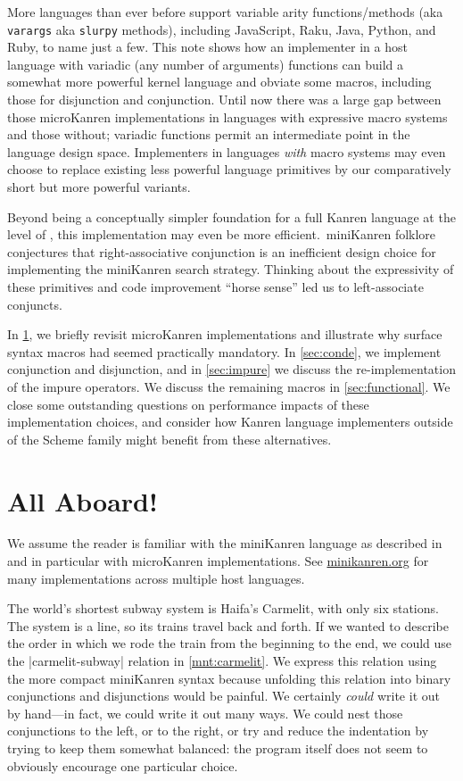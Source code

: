 \documentclass[sigplan,draft,natbib=false]{acmart}
\begin{document}
More languages than ever before support variable arity
functions/methods (aka \verb|varargs| aka \verb|slurpy| methods),
including JavaScript, Raku, Java, Python, and Ruby, to name just a
few. This note shows how an implementer in a host language with
variadic (any number of arguments) functions can build a somewhat more
powerful kernel language and obviate some macros, including those for
disjunction and conjunction. Until now there was a large gap between
those microKanren implementations in languages with expressive macro
systems and those without; variadic functions permit an intermediate
point in the language design space. Implementers in languages
\emph{with} macro systems may even choose to replace existing less
powerful language primitives by our comparatively short but more
powerful variants.

Beyond being a conceptually simpler foundation for a full Kanren
language at the level of , this
implementation may even be more efficient.\ miniKanren folklore
conjectures that right-associative conjunction is an inefficient
design choice for implementing the miniKanren search strategy.
Thinking about the expressivity of these primitives and code
improvement \enquote{horse sense} led us to left-associate conjuncts.

In \cref{sec:all-aboard}, we briefly revisit microKanren
implementations and illustrate why surface syntax macros had seemed
practically mandatory. In \cref{sec:conde}, we implement conjunction
and disjunction, and in \cref{sec:impure} we discuss the
re-implementation of the impure operators. We discuss the remaining
macros in \cref{sec:functional}. We close some outstanding questions
on performance impacts of these implementation choices, and consider
how Kanren language implementers outside of the Scheme family might
benefit from these alternatives.

\section{All Aboard!}\label{sec:all-aboard}

We assume the reader is familiar with the miniKanren language as
described in  and in particular with
microKanren implementations. See \href{minikanren.org}{minikanren.org}
for many implementations across multiple host languages.

The world's shortest subway system is Haifa's Carmelit, with only
six stations. The system is a line, so its trains travel back and
forth. If we wanted to describe the order in which we rode the train
from the beginning to the end, we could use the
\rackinline|carmelit-subway| relation in \cref{mnt:carmelit}. We
express this relation using the more compact miniKanren syntax because
unfolding this relation into binary conjunctions and disjunctions
would be painful. We certainly \emph{could} write it out by hand---in
fact, we could write it out many ways. We could nest those
conjunctions to the left, or to the right, or try and reduce the
indentation by trying to keep them somewhat balanced: the program
itself does not seem to obviously encourage one particular choice.
\end{document}
